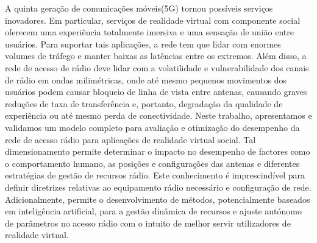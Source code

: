 \begin{resumo}



A quinta geração de comunicações móveis(5G) tornou possíveis serviços inovadores. Em particular, serviços de realidade virtual com componente social oferecem uma experiência totalmente imersiva e uma sensação de união entre usuários. Para suportar tais aplicações, a rede tem que lidar com enormes volumes de tráfego e manter baixas as latências entre os extremos. Além disso, a rede de acesso de rádio deve lidar com a volatilidade e vulnerabilidade dos canais de rádio em ondas milimétricas, onde até mesmo pequenos movimentos dos usuários podem causar bloqueio de linha de vista entre antenas, causando graves reduções de taxa de transferência e, portanto, degradação da qualidade de experiência ou até mesmo perda de conectividade. Neste trabalho, apresentamos e validamos um modelo completo para avaliação e otimização do desempenho da rede de acesso rádio para aplicações de realidade virtual social. Tal dimensionamento permite determinar o impacto no desempenho de factores como o comportamento humano, as posições e configurações das antenas e diferentes estratégias de gestão de recursos rádio. Este conhecimento é imprescindível para definir diretrizes relativas ao equipamento rádio necessário e configuração de rede. Adicionalmente, permite o desenvolvimento de métodos, potencialmente baseados em inteligência artificial, para a gestão dinâmica de recursos e ajuste autónomo de parâmetros no acesso rádio com o intuito de melhor servir utilizadores de realidade virtual.


\end{resumo}
